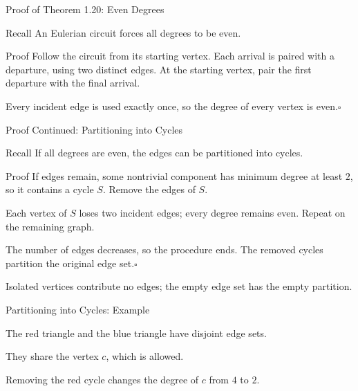 \documentclass[aspectratio=169,11pt]{beamer}
\begin{document}
\begin{frame}{Proof of Theorem 1.20: Even Degrees}
\large
\begin{block}{Recall}
An Eulerian circuit forces all degrees to be even.
\end{block}
\begin{block}{Proof}
\normalsize Follow the circuit from its starting vertex. Each arrival is paired with a departure, using two distinct edges. At the starting vertex, pair the first departure with the final arrival.\par\medskip Every incident edge is used exactly once, so the degree of every vertex is even.\hfill$\square$
\end{block}

\end{frame}

\begin{frame}{Proof Continued: Partitioning into Cycles}
\large
\begin{block}{Recall}
If all degrees are even, the edges can be partitioned into cycles.
\end{block}
\begin{block}{Proof}
\normalsize If edges remain, some nontrivial component has minimum degree at least $2$, so it contains a cycle $S$. Remove the edges of $S$.\par\medskip Each vertex of $S$ loses two incident edges; every degree remains even. Repeat on the remaining graph.\par\medskip The number of edges decreases, so the procedure ends. The removed cycles partition the original edge set.\hfill$\square$
\end{block}
\small Isolated vertices contribute no edges; the empty edge set has the empty partition.
\end{frame}

\begin{frame}{Partitioning into Cycles: Example}
\large
\begin{center}\end{center}The red triangle and the blue triangle have disjoint edge sets.\par\medskip They share the vertex $c$, which is allowed.\par\medskip Removing the red cycle changes the degree of $c$ from $4$ to $2$.
\end{frame}
\end{document}

